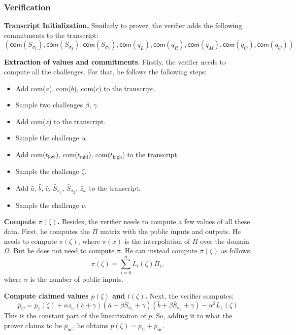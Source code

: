 \documentclass[../../book.tex]{subfiles}
\begin{document}
\subsubsection{Verification}

\textcolor{blue!60!black}{\textbf{Transcript Initialization.}} Similarly to
prover, the verifier adds the following commitments to the transcript:
\begin{equation*}
    (\mathsf{com}(S_{\sigma_1}), \mathsf{com}(S_{\sigma_2}), \mathsf{com}(S_{\sigma_3}), \mathsf{com}(q_L), \mathsf{com}(q_R), \mathsf{com}(q_M), \mathsf{com}(q_O), \mathsf{com}(q_C))
\end{equation*}

\textcolor{blue!60!black}{\textbf{Extraction of values and commitments}.}
Firstly, the verifier needs to compute all the challenges. For that, he follows
the following steps:
\begin{itemize}
    \item Add com($a$), com($b$), com($c$) to the transcript.
    \item Sample two challenges $\beta$, $\gamma$.
    \item Add com($z$) to the transcript.
    \item Sample the challenge $\alpha$.
    \item Add com($t_{\text{low}}$), com($t_{\text{mid}}$), com($t_{\text{high}}$) to the transcript.
    \item Sample the challenge $\zeta$.
    \item Add $\bar{a}$, $\bar{b}$, $\bar{c}$, $\bar{S}_{\sigma_1}$, $\bar{S}_{\sigma_2}$, $\bar{z}_{\omega}$ to the transcript.
    \item Sample the challenge $v$.
\end{itemize}

\textcolor{blue!60!black}{\textbf{Compute $\pi(\zeta)$.}} Besides, the verifier
needs to compute a few values of all these data. First, he computes the $\Pi$
matrix with the public inputs and outputs. He needs to compute $\pi(\zeta)$,
where $\pi(x)$ is the interpolation of $\Pi$ over the domain $\Omega$. But he
does not need to compute $\pi$. He can instead compute $\pi(\zeta)$ as follows:
\begin{equation*}
    \pi(\zeta) = \sum_{i=0}^n L_i(\zeta)\Pi_{i},
\end{equation*}
where $n$ is the number of public inputs.

\textcolor{blue!60!black}{\textbf{Compute claimed values $p(\zeta)$ and
$t(\zeta)$.}} Next, the verifier computes: 
\[\bar{p}_C = p_1(\zeta) + \alpha z_{\omega} \left( \bar{c} + \gamma \right)
\left( \bar{a} + \beta \bar{S}_{\sigma_1} + \gamma \right) \left( \bar{b} +
\beta \bar{S}_{\sigma_2} + \gamma \right) - \alpha^2 L_1(\zeta)\] This is the
constant part of the linearization of $p$. So, adding it to what the prover
claims to be $\bar{p}_{\text{nc}}$, he obtains $p(\zeta) = \bar{p}_C + \bar{p}_{\text{nc}}$.
\end{document}
